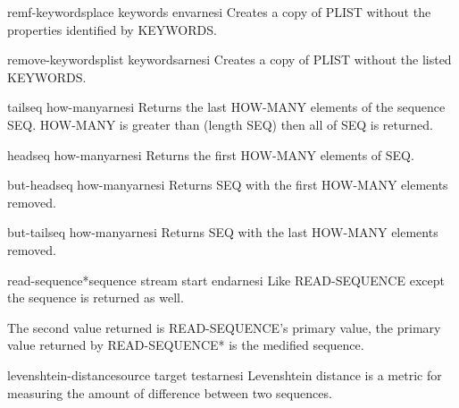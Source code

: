 \begin{macro}{remf-keywords}{place \rest keywords \env env}{arnesi}{}
  Creates a copy of PLIST without the properties identified by KEYWORDS.
\end{macro}

\begin{function}{remove-keywords}{plist \rest keywords}{arnesi}{}
  Creates a copy of PLIST without the listed KEYWORDS.
\end{function}

\begin{function}{tail}{seq \op how-many}{arnesi}{}
  Returns the last HOW-MANY elements of the sequence SEQ. HOW-MANY is
  greater than (length SEQ) then all of SEQ is returned.
\end{function}

\begin{function}{head}{seq \op how-many}{arnesi}{}
  Returns the first HOW-MANY elements of SEQ.
\end{function}

\begin{function}{but-head}{seq \op how-many}{arnesi}{}
  Returns SEQ with the first HOW-MANY elements removed.
\end{function}

\begin{function}{but-tail}{seq \op how-many}{arnesi}{}
  Returns SEQ with the last HOW-MANY elements removed.
\end{function}

\begin{function}{read-sequence*}{sequence stream \key start end}{arnesi}{}
  Like READ-SEQUENCE except the sequence is returned as well.

The second value returned is READ-SEQUENCE's primary value, the
primary value returned by READ-SEQUENCE* is the medified
sequence.
\end{function}

\begin{function}{levenshtein-distance}{source target \key test}{arnesi}{}
  Levenshtein distance is a metric for measuring the amount of
  difference between two sequences.
\end{function}

